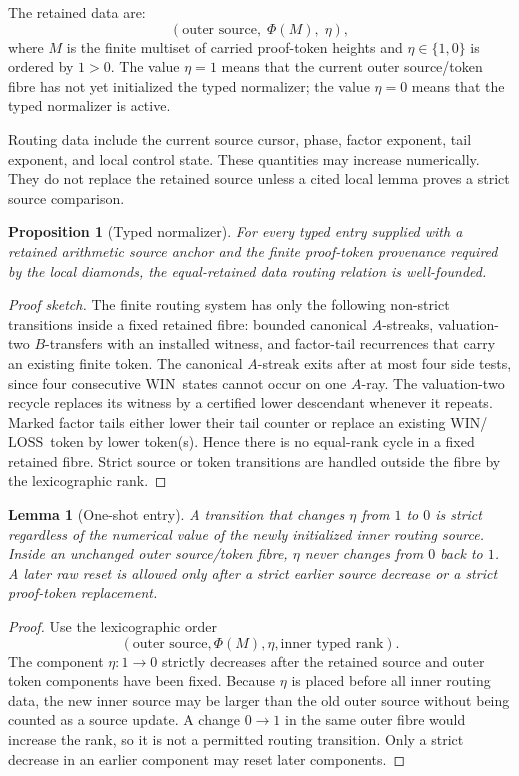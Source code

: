 \documentclass[11pt]{article}
\newtheorem{lemma}[theorem]{Lemma}
\newtheorem{proposition}[theorem]{Proposition}
\newcommand{\WIN}{\ensuremath{\mathrm{WIN}}}
\newcommand{\LOSS}{\ensuremath{\mathrm{LOSS}}}
\begin{document}
The retained data are:
\[
  (\text{outer source},\; \Phi(M),\;\eta),
\]
where $M$ is the finite multiset of carried proof-token heights and
$\eta\in\{1,0\}$ is ordered by $1>0$. The value $\eta=1$ means that the current
outer source/token fibre has not yet initialized the typed normalizer; the
value $\eta=0$ means that the typed normalizer is active.

Routing data include the current source cursor, phase, factor exponent, tail
exponent, and local control state. These quantities may increase numerically.
They do not replace the retained source unless a cited local lemma proves a
strict source comparison.

\begin{proposition}[Typed normalizer]\label{prop:typed-normalizer}
For every typed entry supplied with a retained arithmetic source anchor and the
finite proof-token provenance required by the local diamonds, the equal-retained
data routing relation is well-founded.
\end{proposition}

\begin{proof}[Proof sketch]
The finite routing system has only the following non-strict transitions inside a
fixed retained fibre: bounded canonical $A$-streaks, valuation-two $B$-transfers
with an installed witness, and factor-tail recurrences that carry an existing
finite token. The canonical $A$-streak exits after at most four side tests, since
four consecutive \WIN\ states cannot occur on one $A$-ray. The valuation-two
recycle replaces its witness by a certified lower descendant whenever it repeats.
Marked factor tails either lower their tail counter or replace an existing
\WIN/\LOSS\ token by lower token(s). Hence there is no equal-rank cycle in a
fixed retained fibre. Strict source or token transitions are handled outside the
fibre by the lexicographic rank.
\end{proof}

\begin{lemma}[One-shot entry]\label{lem:eta}
A transition that changes $\eta$ from $1$ to $0$ is strict regardless of the
numerical value of the newly initialized inner routing source. Inside an
unchanged outer source/token fibre, $\eta$ never changes from $0$ back to $1$.
A later raw reset is allowed only after a strict earlier source decrease or a
strict proof-token replacement.
\end{lemma}

\begin{proof}
Use the lexicographic order
\[
  (\text{outer source},\Phi(M),\eta,\text{inner typed rank}).
\]
The component $\eta:1\to0$ strictly decreases after the retained source and
outer token components have been fixed. Because $\eta$ is placed before all
inner routing data, the new inner source may be larger than the old outer source
without being counted as a source update. A change $0\to1$ in the same outer
fibre would increase the rank, so it is not a permitted routing transition.
Only a strict decrease in an earlier component may reset later components.
\end{proof}
\end{document}
